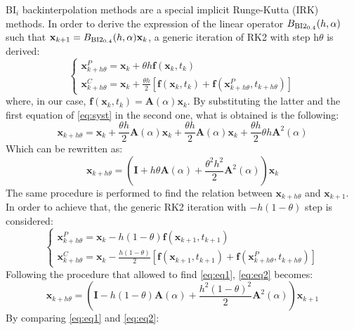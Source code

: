 \documentclass[11pt,a4paper,oneside]{article}
\renewcommand{\vec}[1]{\mathbf{#1}}
\begin{document}
BI$_i$ backinterpolation methods are a special implicit Runge-Kutta (IRK) methods. In order to derive the expression of the 
linear operator $B_{\rm BI2_{0.4}}(h,\alpha)$ such that $\vec x_{k+1} = B_{\rm BI2_{0.4}}(h,\alpha) \vec x_k$, a generic 
iteration of RK2 with step h$\theta$ is derived:
\begin{equation}
    \begin{cases}
        \vec{x}_{k+h\theta}^P = \vec{x}_k + \theta h\vec{f}(\vec{x}_k, t_k) \\
        \vec{x}_{k+h\theta}^C = \vec{x}_k + \frac{\theta h}{2}[\vec{f}(\vec{x}_k, t_k) + \vec{f}(\vec{x}_{k+h\theta}^P, t_{k+h\theta})]
\end{cases}
\label{eq:syst}
\end{equation}
where, in our case, $\vec{f}(\vec{x}_k, t_k)= \vec{A}(\alpha)\vec{x}_k$. By substituting the latter and the first equation of \autoref{eq:syst} in the second one, what is obtained is the following:
\begin{equation}
    \vec{x}_{k+h\theta} = \vec{x}_k + \frac{\theta h}{2}\vec{A}(\alpha)\vec{x}_k + \frac{\theta h}{2}\vec{A}(\alpha)\vec{x}_k + \frac{\theta h}{2}\theta h \vec{A}^2(\alpha)
\end{equation}
Which can be rewritten as:
\begin{equation}
    \vec{x}_{k+h\theta} = (\vec{I} + h\theta\vec{A}(\alpha) + \frac{\theta^2h^2}{2}\vec{A}^2(\alpha))\vec{x}_k
    \label{eq:eq1}
\end{equation}
The same procedure is performed to find the relation between $\vec{x}_{k+h\theta}$ and $\vec{x}_{k+1}$. In order to achieve that, the generic RK2 iteration with $-h(1-\theta)$ step is considered:
\begin{equation}
    \begin{cases}
        \vec{x}_{k+h\theta}^P = \vec{x}_k - h(1-\theta)\vec{f}(\vec{x}_{k+1}, t_{k+1}) \\
        \vec{x}_{k+h\theta}^C = \vec{x}_k - \frac{h(1-\theta)}{2}[\vec{f}(\vec{x}_{k+1}, t_{k+1}) + \vec{f}(\vec{x}_{k+h\theta}^P, t_{k+h\theta})]
\end{cases}
\label{eq:eq2}
\end{equation}
Following the procedure that allowed to find \autoref{eq:eq1}, \autoref{eq:eq2} becomes:
\begin{equation}
    \vec{x}_{k+h\theta} = (\vec{I} - h(1-\theta)\vec{A}(\alpha) + \frac{h^2(1-\theta)^2}{2}\vec{A}^2(\alpha))\vec{x}_{k+1}
\end{equation}
By comparing \autoref{eq:eq1} and \autoref{eq:eq2}:
\end{document}
